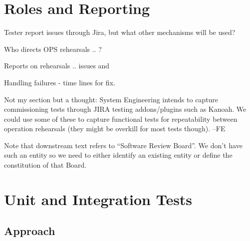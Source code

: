




\section{Roles and Reporting}

Tester report issues through Jira, but what other mechanisms will be used?

Who directs OPS rehearsals .. ?

Reports on rehearsals .. issues and

Handling failures - time lines for fix.


\begin{note}
  Not my section but a thought: System Engineering intends to capture commissioning tests through JIRA testing addons/plugins such as Kanoah. We could use some of these to capture functional tests for repeatability between operation rehearsals (they might be overkill for most tests though). --FE
\end{note}

\begin{note}
  Note that downstream text refers to ``Software Review Board''. We don't have such an entity so we need to either identify an existing entity or define the constitution of that Board.
\end{note}


















\section{Unit and Integration Tests}

\subsection{Approach}

